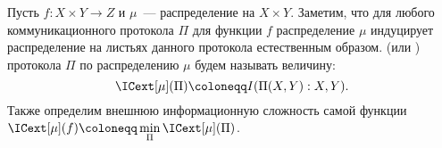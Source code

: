 







\begin{definition*}
    Пусть $f: X \times Y \to Z$ и $\mu$~--- распределение на $X \times Y$. Заметим, что для любого
    коммуникационного протокола $\Pi$ для функции $f$ распределение $\mu$ индуцирует распределение на
    листьях данного протокола естественным образом.  (или
    ) протокола $\Pi$ по распределению $\mu$ будем называть
    величину:
    $$\ICext[\mu](\Pi) \coloneqq I(\Pi(X, Y) : X, Y).$$
    Также определим внешнюю информационную сложность самой функции
    $\ICext[\mu](f) \coloneqq \min\limits_{\Pi} \ICext[\mu](\Pi)$.
\end{definition*}




\breakline







